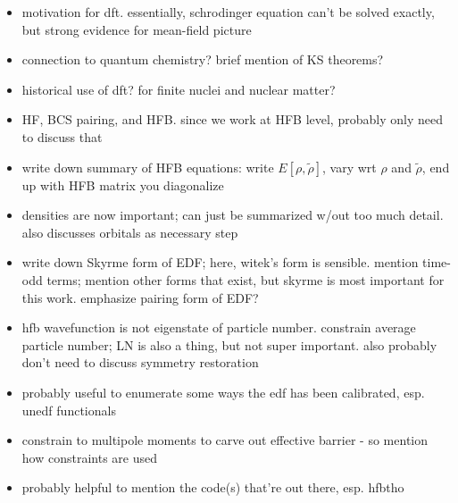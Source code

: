 \documentclass[../thesis.tex]{subfiles}
\begin{document}
\newpage
\begin{itemize}
	\item motivation for dft. essentially, schrodinger equation can't be solved exactly, but strong evidence for mean-field picture
	\item connection to quantum chemistry? brief mention of KS theorems?
	\item historical use of dft? for finite nuclei and nuclear matter?
	\item HF, BCS pairing, and HFB. since we work at HFB level, probably only need to discuss that
	\item write down summary of HFB equations: write $E[\rho,\tilde{\rho}]$, vary wrt $\rho$ and $\tilde{\rho}$, end up with HFB matrix you diagonalize
	\item densities are now important; can just be summarized w/out too much detail. also discusses orbitals as necessary step
	\item write down Skyrme form of EDF; here, witek's form is sensible. mention time-odd terms; mention other forms that exist, but skyrme is most important for this work. emphasize pairing form of EDF?
	\item hfb wavefunction is not eigenstate of particle number. constrain average particle number; LN is also a thing, but not super important. also probably don't need to discuss symmetry restoration
	\item probably useful to enumerate some ways the edf has been calibrated, esp. unedf functionals
	\item constrain to multipole moments to carve out effective barrier - so mention how constraints are used
	\item probably helpful to mention the code(s) that're out there, esp. hfbtho
\end{itemize}
\end{document}
